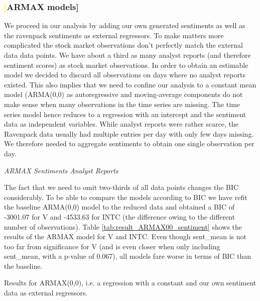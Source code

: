 \subsubsection{\textcolor{yellow}[ARMAX models]}
We proceed in our analysis by adding our own generated sentiments as well as the ravenpack sentiments as external regressors. To make matters more complicated the stock market observations don't perfectly match the external data data points. We have about a third as many analyst reports (and therefore sentiment scores) as stock market observations. In order to obtain an estimable model we decided to discard all observations on days where no analyst reports existed. This also implies that we need to confine our analysis to a constant mean model (ARMA(0,0) as autoregressive and moving-average components do not make sense when many observations in the time series are missing. The time series model hence reduces to a regression with an intercept and the sentiment data as independent variables. While analyst reports were rather scarce, the Ravenpack data usually had multiple entries per day with only few days missing. We therefore needed to aggregate sentiments to obtain one single observation per day. 


\textit{ARMAX Sentiments Analyst Reports}

The fact that we need to omit two-thirds of all data points changes the BIC considerably. To be able to compare the models according to BIC we have refit the baseline ARMA(0,0) model to the reduced data and obtained a BIC of -3001.07 for V and -4533.63 for INTC (the difference owing to the different number of observations). Table \ref{tab:result_ARMAX00_sentiment} shows the results of the ARMAX model for V and INTC. Even though sent\_mean is not too far from significance for V (and is even closer when only including sent\_mean, with a p-value of 0.067), all models fare worse in terms of BIC than the baseline. 

\begin{table}[h!]
    \centering
    \vspace{-2ex}
    \small
    
    \vspace{1ex}
    
    \vspace{-2ex}
    \small
    
    \caption{Results for ARMAX(0,0), i.e. a regression with a constant and our own sentiment data as external regressors.}
    \label{tab:result_ARMAX00_sentiment}
\end{table}{}

